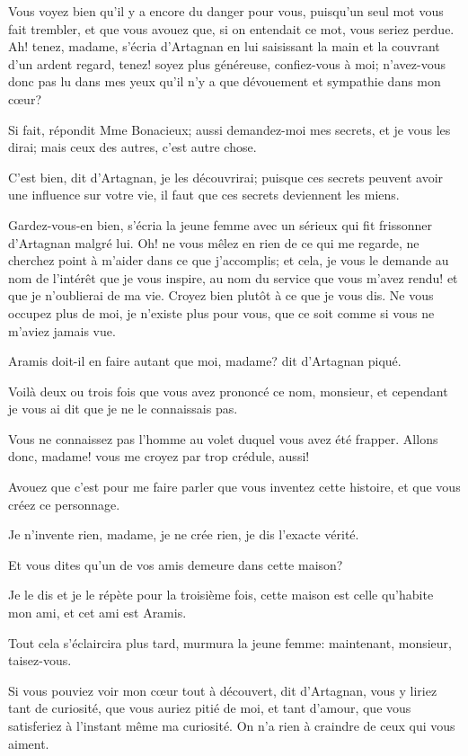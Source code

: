 \speak  Vous voyez bien qu'il y a encore du danger pour vous, puisqu'un seul mot vous fait trembler, et que vous avouez que, si on entendait ce mot, vous seriez perdue. Ah! tenez, madame, s'écria d'Artagnan en lui saisissant la main et la couvrant d'un ardent regard, tenez! soyez plus généreuse, confiez-vous à moi; n'avez-vous donc pas lu dans mes yeux qu'il n'y a que dévouement et sympathie dans mon cœur? 

\speak  Si fait, répondit Mme Bonacieux; aussi demandez-moi mes secrets, et je vous les dirai; mais ceux des autres, c'est autre chose. 

\speak  C'est bien, dit d'Artagnan, je les découvrirai; puisque ces secrets peuvent avoir une influence sur votre vie, il faut que ces secrets deviennent les miens. 

\speak  Gardez-vous-en bien, s'écria la jeune femme avec un sérieux qui fit frissonner d'Artagnan malgré lui. Oh! ne vous mêlez en rien de ce qui me regarde, ne cherchez point à m'aider dans ce que j'accomplis; et cela, je vous le demande au nom de l'intérêt que je vous inspire, au nom du service que vous m'avez rendu! et que je n'oublierai de ma vie. Croyez bien plutôt à ce que je vous dis. Ne vous occupez plus de moi, je n'existe plus pour vous, que ce soit comme si vous ne m'aviez jamais vue. 

\speak  Aramis doit-il en faire autant que moi, madame? dit d'Artagnan piqué. 

\speak  Voilà deux ou trois fois que vous avez prononcé ce nom, monsieur, et cependant je vous ai dit que je ne le connaissais pas. 

\speak  Vous ne connaissez pas l'homme au volet duquel vous avez été frapper. Allons donc, madame! vous me croyez par trop crédule, aussi! 

\speak  Avouez que c'est pour me faire parler que vous inventez cette histoire, et que vous créez ce personnage. 

\speak  Je n'invente rien, madame, je ne crée rien, je dis l'exacte vérité. 

\speak  Et vous dites qu'un de vos amis demeure dans cette maison? 

\speak  Je le dis et je le répète pour la troisième fois, cette maison est celle qu'habite mon ami, et cet ami est Aramis. 

\speak  Tout cela s'éclaircira plus tard, murmura la jeune femme: maintenant, monsieur, taisez-vous. 

\speak  Si vous pouviez voir mon cœur tout à découvert, dit d'Artagnan, vous y liriez tant de curiosité, que vous auriez pitié de moi, et tant d'amour, que vous satisferiez à l'instant même ma curiosité. On n'a rien à craindre de ceux qui vous aiment. 

